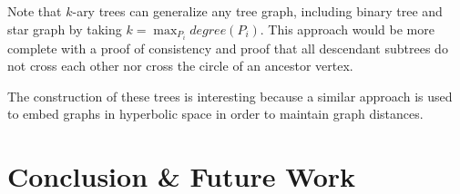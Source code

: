 \documentclass{NSF}
\begin{document}
Note that $k$-ary trees can generalize any tree graph, including binary tree and star graph by taking $k=\displaystyle \max_{P_i} degree(P_i)$. This approach would be more complete with a proof of consistency and proof that all descendant subtrees do not cross each other nor  cross the circle of an ancestor vertex.

The construction of these trees is interesting because a similar approach \cite{Chamberlain:2017arXiv170510359C} \cite{Nickel:NIPS2017_7213} is used to embed graphs in hyperbolic space in order to maintain graph distances. 

\section{Conclusion \& Future Work}

\newpage
\end{document}
